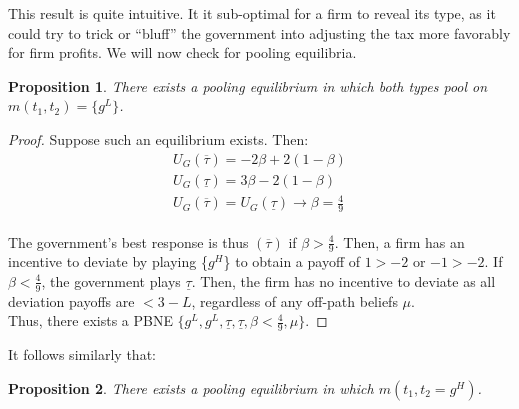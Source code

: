 \documentclass{article}
\newtheorem{proposition}{Proposition}
\begin{document}
This result is quite intuitive. It it sub-optimal for a firm to reveal its type, as it could try to trick or “bluff” the government into adjusting the tax more favorably for firm profits. We will now check for pooling equilibria. \\

\begin{proposition}
    There exists a pooling equilibrium in which both types pool on $m(t_1, t_2) = \{g^L\}$.
\end{proposition}

\begin{proof}
    Suppose such an equilibrium exists. Then:
    \begin{align*}
        U_G(\overline{\tau}) = -2\beta+2(1-\beta) \\
        U_G(\underline{\tau}) = 3\beta-2(1-\beta) \\
        U_G(\overline{\tau}) = U_G(\underline{\tau}) \xrightarrow[]{} \beta = \frac{4}{9}
    \end{align*}

    The government's best response is thus $(\overline{\tau})$ if $\beta > \frac{4}{9}$. 
    Then, a firm has an incentive to deviate by playing \{$g^H$\} to obtain a payoff of $1 > -2$ or $-1 > -2$. 
    If $\beta < \frac{4}{9}$, the government plays $\underline{\tau}$. Then, the firm has no incentive to deviate as all deviation payoffs are  $< 3 - L$, regardless of any off-path beliefs $\mu$. \\
    
Thus, there exists a PBNE $\{g^L, g^L, \underline{\tau}, \underline{\tau}, \beta < \frac{4}{9}, \mu\}$.
\end{proof} 
\vspace{0.5cm}

It follows similarly that: 

\begin{proposition}
    There exists a pooling equilibrium in which $m(t_1, t_2 = g^H)$.
\end{proposition}
\end{document}
